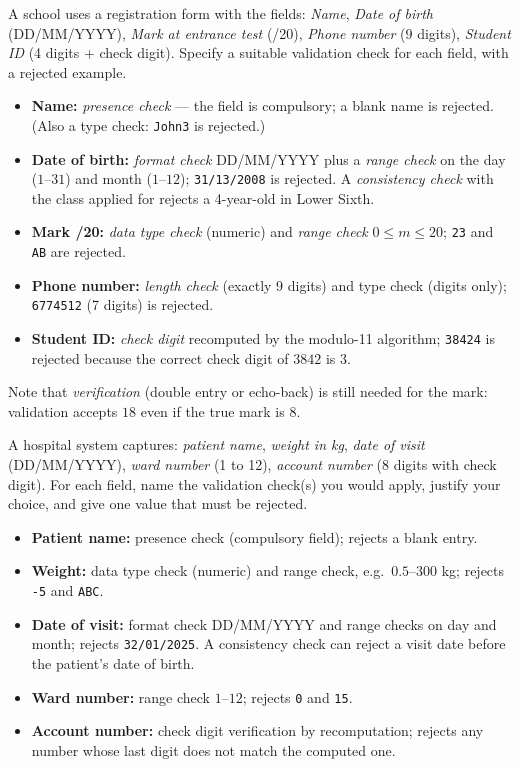 \documentclass[11pt]{article}
\begin{document}
\begin{exoresolu}
A school uses a registration form with the fields: \emph{Name}, \emph{Date of birth} (DD/MM/YYYY), \emph{Mark at entrance test} (/20), \emph{Phone number} (9 digits), \emph{Student ID} (4 digits + check digit). Specify a suitable validation check for each field, with a rejected example.
\tcblower
\begin{itemize}
\item \textbf{Name:} \emph{presence check} --- the field is compulsory; a blank name is rejected. (Also a type check: \texttt{John3} is rejected.)
\item \textbf{Date of birth:} \emph{format check} DD/MM/YYYY plus a \emph{range check} on the day ($1$--$31$) and month ($1$--$12$); \texttt{31/13/2008} is rejected. A \emph{consistency check} with the class applied for rejects a 4-year-old in Lower Sixth.
\item \textbf{Mark /20:} \emph{data type check} (numeric) and \emph{range check} $0 \le m \le 20$; \texttt{23} and \texttt{AB} are rejected.
\item \textbf{Phone number:} \emph{length check} (exactly 9 digits) and type check (digits only); \texttt{6774512} (7 digits) is rejected.
\item \textbf{Student ID:} \emph{check digit} recomputed by the modulo-11 algorithm; \texttt{38424} is rejected because the correct check digit of $3842$ is $3$.
\end{itemize}
Note that \emph{verification} (double entry or echo-back) is still needed for the mark: validation accepts $18$ even if the true mark is $8$.
\end{exoresolu}

\begin{exercice}
A hospital system captures: \emph{patient name}, \emph{weight in kg}, \emph{date of visit} (DD/MM/YYYY), \emph{ward number} (1 to 12), \emph{account number} (8 digits with check digit). For each field, name the validation check(s) you would apply, justify your choice, and give one value that must be rejected.
\end{exercice}

\begin{corrige}[Exercise 1]
\begin{itemize}
\item \textbf{Patient name:} presence check (compulsory field); rejects a blank entry.
\item \textbf{Weight:} data type check (numeric) and range check, e.g.\ $0.5$--$300$ kg; rejects \texttt{-5} and \texttt{ABC}.
\item \textbf{Date of visit:} format check DD/MM/YYYY and range checks on day and month; rejects \texttt{32/01/2025}. A consistency check can reject a visit date before the patient's date of birth.
\item \textbf{Ward number:} range check $1$--$12$; rejects \texttt{0} and \texttt{15}.
\item \textbf{Account number:} check digit verification by recomputation; rejects any number whose last digit does not match the computed one.
\end{itemize}
\end{corrige}
\end{document}
